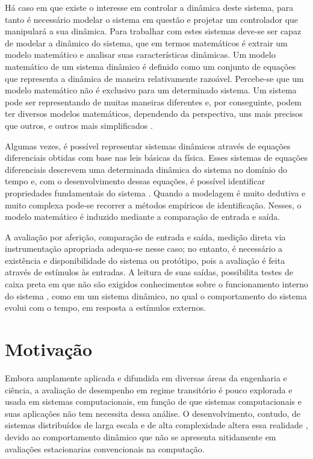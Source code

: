 Há caso em que existe o interesse em controlar a dinâmica deste sistema, para tanto é necessário modelar o sistema em questão e projetar um controlador que manipulará a sua dinâmica. Para trabalhar com estes sistemas deve-se ser capaz de modelar a dinâmico do sistema, que em termos matemáticos é extrair um modelo matemático e analisar suas características dinâmicas. Um modelo matemático de um sistema dinâmico é definido como um conjunto de equações que representa a dinâmica de maneira relativamente razoável. Percebe-se que um modelo matemático não é exclusivo para um determinado sistema. Um sistema pode ser representando de muitas maneiras diferentes e, por conseguinte, podem ter diversos modelos matemáticos, dependendo da perspectiva, uns mais precisos que outros, e outros mais simplificados \cite{Ogata2001}.

Algumas vezes, é possível representar sistemas dinâmicos através de equações diferenciais obtidas com base nas leis básicas da física. Esses sistemas de equações diferenciais descrevem uma determinada dinâmica do sistema no domínio do tempo e, com o desenvolvimento dessas equações, é possível identificar propriedades fundamentais do sistema \cite{Nobile2013}. Quando a modelagem é muito dedutiva e muito complexa pode-se recorrer a métodos empíricos de identificação. Nesses, o modelo matemático é induzido mediante a comparação de entrada e saída.	

A avaliação por aferição, comparação de entrada e saída, medição direta via instrumentação apropriada adequa-se nesse caso; no entanto, é necessário a existência e disponibilidade do sistema ou protótipo, pois a avaliação é feita através de estímulos às entradas. A leitura de suas saídas, possibilita testes de caixa preta em que não são exigidos conhecimentos sobre o funcionamento interno do sistema \cite{Nobile2013}, como em um sistema dinâmico, no qual o comportamento do sistema evolui com o tempo, em resposta a estímulos externos.

\section{Motivação}

Embora amplamente aplicada e difundida em diversas áreas da engenharia e ciência, a avaliação de desempenho em regime transitório é pouco explorada e usada em sistemas computacionais, em função de que sistemas computacionais e suas aplicações não tem necessita dessa análise. O desenvolvimento, contudo, de sistemas distribuídos de larga escala e de alta complexidade altera essa realidade \cite{hpcs2015, Lourenco2015, medc}, devido ao comportamento dinâmico que não se apresenta nitidamente em avaliações estacionarias convencionais na computação. 

